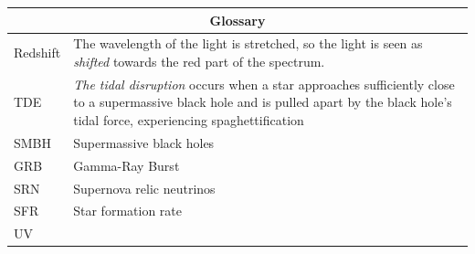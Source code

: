 \documentclass[fleqn]{article}
\begin{document}
  \begin{tabular}{ |p{2cm}|p{9cm}|  }
    \hline
    \multicolumn{2}{|c|}{Glossary} \\
    \hline
      Redshift & The wavelength of the light is stretched, so the light is seen as \emph{shifted} 
      towards the red part of the spectrum.
      \\
      TDE & \emph{The tidal disruption} occurs when a star approaches sufficiently close to a supermassive 
      black hole and is pulled apart by the black hole's tidal force, experiencing spaghettification 
      \\
      SMBH & Supermassive black holes  
      \\
      GRB & Gamma-Ray Burst
      \\
      SRN & Supernova relic neutrinos
      \\
      SFR & Star formation rate
      \\
      UV
      \\
    \hline
  \end{tabular}

  \pagebreak

  \printbibliography
  
\end{document}
